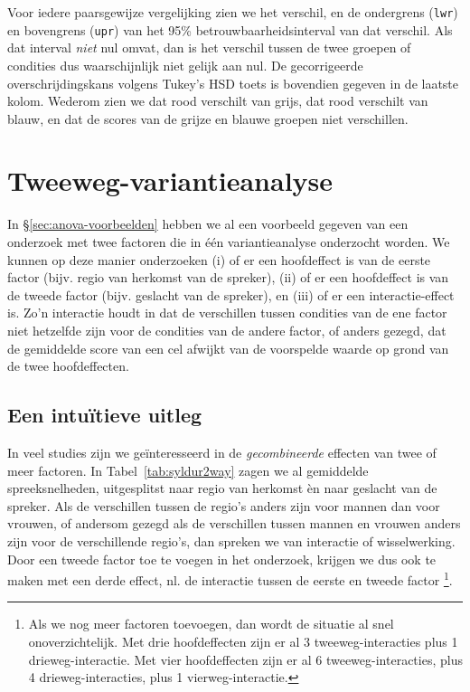 \documentclass[
]{book}
\begin{document}
Voor iedere paarsgewijze vergelijking zien we het verschil, en de
ondergrens (\texttt{lwr}) en bovengrens (\texttt{upr}) van het 95\%
betrouwbaarheidsinterval van dat verschil. Als dat interval \emph{niet} nul
omvat, dan is het verschil tussen de twee groepen of condities dus
waarschijnlijk niet gelijk aan nul. De gecorrigeerde overschrijdingskans
volgens Tukey's HSD toets is bovendien gegeven in de laatste kolom.
Wederom zien we dat rood verschilt van grijs, dat rood verschilt van
blauw, en dat de scores van de grijze en blauwe groepen niet
verschillen.

\hypertarget{tweeweg-variantieanalyse}{%
\section{Tweeweg-variantieanalyse}\label{tweeweg-variantieanalyse}}

In §\ref{sec:anova-voorbeelden} hebben we al een voorbeeld gegeven
van een onderzoek met twee factoren die in één variantieanalyse
onderzocht worden. We kunnen op deze manier onderzoeken (i) of er een
hoofdeffect is van de eerste factor (bijv. regio van herkomst van de
spreker), (ii) of er een hoofdeffect is van de tweede factor (bijv.
geslacht van de spreker), en (iii) of er een interactie-effect is. Zo'n
interactie houdt in dat de verschillen tussen condities van de ene
factor niet hetzelfde zijn voor de condities van de andere factor, of
anders gezegd, dat de gemiddelde score van een cel afwijkt van de
voorspelde waarde op grond van de twee hoofdeffecten.

\hypertarget{een-intuuxeftieve-uitleg}{%
\subsection{Een intuïtieve uitleg}\label{een-intuuxeftieve-uitleg}}

In veel studies zijn we geïnteresseerd in de \emph{gecombineerde} effecten
van twee of meer factoren. In
Tabel~\ref{tab:syldur2way} zagen we al gemiddelde spreeksnelheden,
uitgesplitst naar regio van herkomst èn naar geslacht van de spreker.
Als de verschillen tussen de regio's anders zijn voor mannen dan voor
vrouwen, of andersom gezegd als de verschillen tussen mannen en vrouwen
anders zijn voor de verschillende regio's, dan spreken we van interactie
of wisselwerking. Door een tweede factor toe te voegen in het onderzoek,
krijgen we dus ook te maken met een derde effect, nl. de interactie
tussen de eerste en tweede factor
\footnote{Als we nog meer factoren toevoegen, dan wordt de situatie al snel onoverzichtelijk. Met drie hoofdeffecten zijn er al 3 tweeweg-interacties plus 1 drieweg-interactie. Met vier hoofdeffecten zijn er al 6 tweeweg-interacties, plus 4 drieweg-interacties, plus 1 vierweg-interactie.}.
\end{document}
